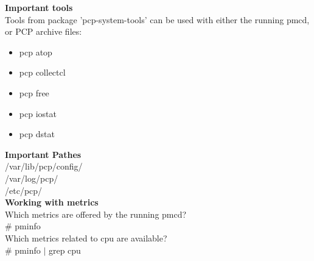 \documentclass[12pt]{article}
\begin{document}
\begin{tcbposter}
{	\textbf{Important tools}\\
	Tools from package 'pcp-system-tools' can be used with either 
	the running pmcd, or PCP archive files:
	\begin{itemize}
	    \item pcp atop
	    \item pcp collectcl
	    \item pcp free
	    \item pcp iostat
	    \item pcp dstat
	\end{itemize}
	
	\textbf{Important Pathes}\\
	    \hspace*{0.5cm}/var/lib/pcp/config/ \\
	    \hspace*{0.5cm}/var/log/pcp/ \\
	    \hspace*{0.5cm}/etc/pcp/ \\
	
	\textbf{Working with metrics}\\
	Which metrics are offered by the running pmcd? \\
	    \hspace*{0.5cm}\# pminfo \\
	
	Which metrics related to cpu are available? \\
	    \hspace*{0.5cm}\# pminfo $\vert$ grep cpu \\
	
	\vspace{0.0em} %
	}




\end{tcbposter}
\end{document}
